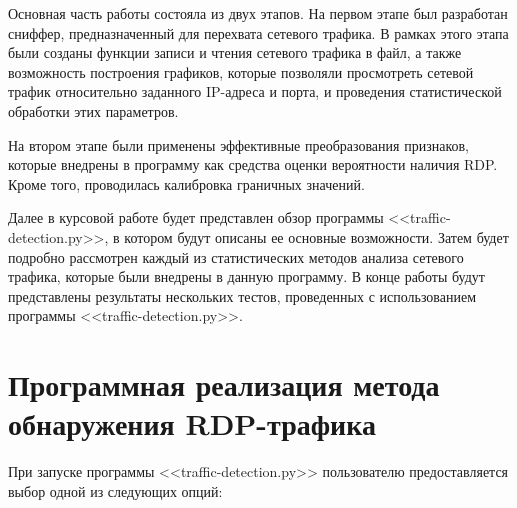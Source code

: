 \documentclass[bachelor, och, coursework]{SCWorks}
\begin{document}
Основная часть работы состояла из двух этапов. На первом этапе был разработан сниффер, предназначенный для перехвата сетевого трафика. 
В рамках этого этапа были созданы функции записи и чтения сетевого трафика в файл, а также возможность построения графиков, которые 
позволяли просмотреть сетевой трафик относительно заданного IP-адреса и порта, и проведения статистической обработки этих параметров.

На втором этапе были применены эффективные преобразования признаков, которые внедрены в программу как средства оценки вероятности наличия RDP. 
Кроме того, проводилась калибровка граничных значений. 

Далее в курсовой работе будет представлен обзор программы <<traffic-detection.py>>, в котором будут описаны ее основные возможности. 
Затем будет подробно рассмотрен каждый из статистических методов анализа сетевого трафика, которые были внедрены в данную программу. 
В конце работы будут представлены результаты нескольких тестов, проведенных с использованием программы <<traffic-detection.py>>.


\section{Программная реализация метода обнаружения RDP-трафика}

При запуске программы <<traffic-detection.py>> пользователю предоставляется выбор одной из следующих опций:
\end{document}
